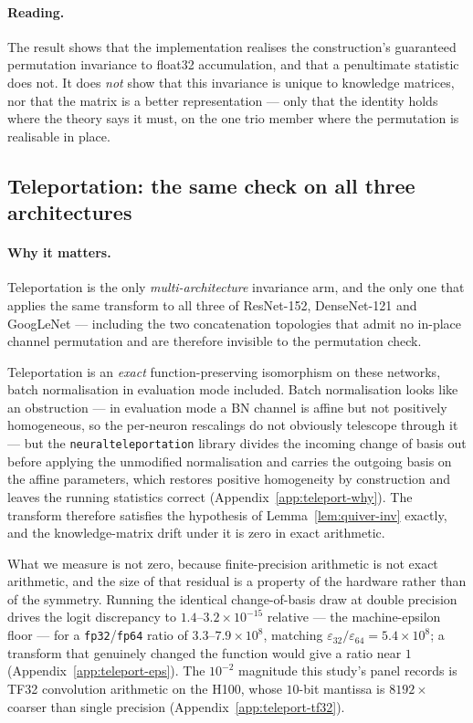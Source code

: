 \paragraph{Reading.}
The result shows that the implementation realises the construction's
guaranteed permutation invariance to float32 accumulation, and that a
penultimate statistic does not. It does \emph{not} show that this
invariance is unique to knowledge matrices, nor that the matrix is a
better representation --- only that the identity holds where the theory
says it must, on the one trio member where the permutation is realisable
in place.

\subsection{Teleportation: the same check on all three architectures}
\label{sec:study1b}

\paragraph{Why it matters.}
Teleportation is the only \emph{multi-architecture} invariance arm, and the only
one that applies the same transform to all three of ResNet-152, DenseNet-121 and
GoogLeNet --- including the two concatenation topologies that admit no in-place
channel permutation and are therefore invisible to the permutation check.

Teleportation is an \emph{exact} function-preserving isomorphism on these
networks, batch normalisation in evaluation mode included. Batch normalisation
looks like an obstruction --- in evaluation mode a BN channel is affine but not
positively homogeneous, so the per-neuron rescalings do not obviously telescope
through it --- but the \texttt{neuralteleportation} library divides the incoming
change of basis out before applying the unmodified normalisation and carries the
outgoing basis on the affine parameters, which restores positive homogeneity by
construction and leaves the running statistics correct
(Appendix~\ref{app:teleport-why}). The transform therefore satisfies the
hypothesis of Lemma~\ref{lem:quiver-inv} exactly, and the knowledge-matrix drift
under it is zero in exact arithmetic.

What we measure is not zero, because finite-precision arithmetic is not exact
arithmetic, and the size of that residual is a property of the hardware rather
than of the symmetry. Running the identical change-of-basis draw at double
precision drives the logit discrepancy to $1.4$--$3.2\times10^{-15}$ relative ---
the machine-epsilon floor --- for a \texttt{fp32}/\texttt{fp64} ratio of
$3.3$--$7.9\times10^{8}$, matching $\varepsilon_{32}/\varepsilon_{64}=
5.4\times10^{8}$; a transform that genuinely changed the function would give a
ratio near $1$ (Appendix~\ref{app:teleport-eps}). The $10^{-2}$ magnitude this
study's panel records is TF32 convolution arithmetic on the H100, whose $10$-bit
mantissa is $8192\times$ coarser than single precision
(Appendix~\ref{app:teleport-tf32}).

